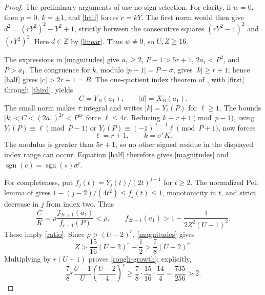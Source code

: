 \documentclass[11pt]{article}
\newcommand{\Z}{\mathbb Z}\newcommand{\Q}{\mathbb Q}
\begin{document}
\begin{proof}
The preliminary arguments of \cite[Section 3]{Signed} use no sign
selection. For clarity, if \(w=0\), then \(p=0\), \(k=\pm1\),
and \eqref{half} forces \(c=kY\). The first norm would then give
\(d^2=(rY^2)^2-Y^2+1\), strictly between the consecutive squares
\((rY^2-1)^2\) and \((rY^2)^2\). Here \(d\in\Z\) by
\eqref{linear}. Thus \(w\ne0\), so \(U,Z\ge16\).

The expressions in \eqref{magnitudes} give \(a_1\ge2\),
\(P-1>5r+1\), \(2a_1<P^2\), and \(P>a_1\).
The congruence for \(k\), modulo \(|p-1|=P-\sigma\), gives
\(|k|\ge r+1\); hence \eqref{half} gives \(|c|>2r+1=B\).
The one-quotient index theorem of \cite{CRT}, with \eqref{first}
through \eqref{third}, yields
\[
                C=Y_B(a_1),\qquad |d|=X_B(a_1).
\]
The small norm makes \(\tau\) integral and writes
\(|k|=Y_\ell(P)\) for \(\ell\ge1\). The bounds
\(|k|<C<(2a_1)^{2r}<P^{4r}\) force \(\ell\le4r\).
Reducing \(k\equiv r+1\pmod{p-1}\), using
\(Y_\ell(P)\equiv\ell\pmod{P-1}\) or
\(Y_\ell(P)\equiv(-1)^{\ell-1}\ell\pmod{P+1}\),
now forces
\[
                         \ell=r+1,\qquad k=\sigma^rK.
\]
The modulus is greater than \(5r+1\), so no other signed residue
in the displayed index range can occur. Equation \eqref{half}
therefore gives \eqref{magnitudes} and
\(\operatorname{sgn}(c)=\operatorname{sgn}(s)\sigma^r\).

For completeness, put \(f_j(t)=Y_j(t)/(2t)^{j-1}\) for \(t\ge2\).
The normalized Pell lemma of \cite{Binomial} gives
\(1-(j-2)/(4t^2)\le f_j(t)\le1\), monotonicity in \(t\),
and strict decrease in \(j\) from index two. Thus
\[
 \frac CK=\rho\frac{f_{2r+1}(a_1)}{f_{r+1}(P)}<\rho,
 \qquad
 f_{2r+1}(a_1)>1-\frac1{2Z^2(U-1)^2}.
\]
These imply \eqref{ratio}. Since \(\rho>(U-2)^r\),
\eqref{magnitudes} gives
\[
 Z>\frac{15}{16}(U-2)^r-\frac12>\frac78(U-2)^r.
\]
Multiplying by \(r(U-1)\) proves \eqref{rough-growth}; explicitly,
\[
 \frac78r\frac{U-1}{U}\left(\frac{U-2}{4}\right)^r
 \ge\frac78\cdot\frac{15}{16}\cdot\frac{14}{4}
 =\frac{735}{256}>2.
\]


\end{proof}
\end{document}
